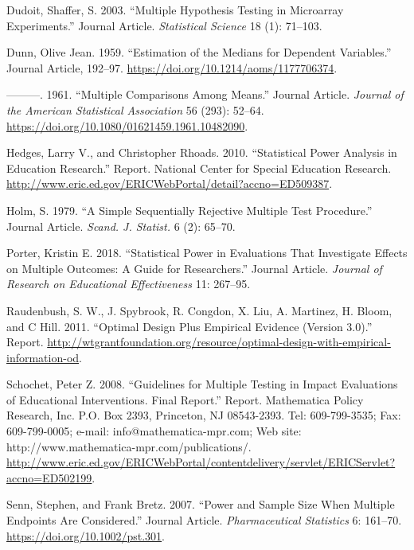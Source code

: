 \documentclass[
]{article}
\newlength{\cslhangindent}
\newlength{\cslentryspacingunit} %
\newenvironment{CSLReferences}[2] %
 {%
  \setlength{\parindent}{0pt}
  \ifodd #1
  \let\oldpar\par
  \def\par{\hangindent=\cslhangindent\oldpar}
  \fi
  \setlength{\parskip}{#2\cslentryspacingunit}
 }%
 {}
\begin{document}
\begin{CSLReferences}{1}{0}
\leavevmode{}%
Dudoit, Shaffer, S. 2003. {``Multiple Hypothesis Testing in Microarray
Experiments.''} Journal Article. \emph{Statistical Science} 18 (1):
71--103.

\leavevmode{}%
Dunn, Olive Jean. 1959. {``Estimation of the Medians for Dependent
Variables.''} Journal Article, 192--97.
\url{https://doi.org/10.1214/aoms/1177706374}.

\leavevmode{}%
---------. 1961. {``Multiple Comparisons Among Means.''} Journal
Article. \emph{Journal of the American Statistical Association} 56
(293): 52--64. \url{https://doi.org/10.1080/01621459.1961.10482090}.

\leavevmode{}%
Hedges, Larry V., and Christopher Rhoads. 2010. {``Statistical Power
Analysis in Education Research.''} Report. National Center for Special
Education Research.
\url{http://www.eric.ed.gov/ERICWebPortal/detail?accno=ED509387}.

\leavevmode{}%
Holm, S. 1979. {``A Simple Sequentially Rejective Multiple Test
Procedure.''} Journal Article. \emph{Scand. J. Statist.} 6 (2): 65--70.

\leavevmode{}%
Porter, Kristin E. 2018. {``Statistical Power in Evaluations That
Investigate Effects on Multiple Outcomes: A Guide for Researchers.''}
Journal Article. \emph{Journal of Research on Educational Effectiveness}
11: 267--95.

\leavevmode{}%
Raudenbush, S. W., J. Spybrook, R. Congdon, X. Liu, A. Martinez, H.
Bloom, and C Hill. 2011. {``Optimal Design Plus Empirical Evidence
(Version 3.0).''} Report.
\url{http://wtgrantfoundation.org/resource/optimal-design-with-empirical-information-od}.

\leavevmode{}%
Schochet, Peter Z. 2008. {``Guidelines for Multiple Testing in Impact
Evaluations of Educational Interventions. Final Report.''} Report.
Mathematica Policy Research, Inc. P.O. Box 2393, Princeton, NJ
08543-2393. Tel: 609-799-3535; Fax: 609-799-0005; e-mail:
info@mathematica-mpr.com; Web site:
http://www.mathematica-mpr.com/publications/.
\url{http://www.eric.ed.gov/ERICWebPortal/contentdelivery/servlet/ERICServlet?accno=ED502199}.

\leavevmode{}%
Senn, Stephen, and Frank Bretz. 2007. {``Power and Sample Size When
Multiple Endpoints Are Considered.''} Journal Article.
\emph{Pharmaceutical Statistics} 6: 161--70.
\url{https://doi.org/10.1002/pst.301}.


\end{CSLReferences}
\end{document}
